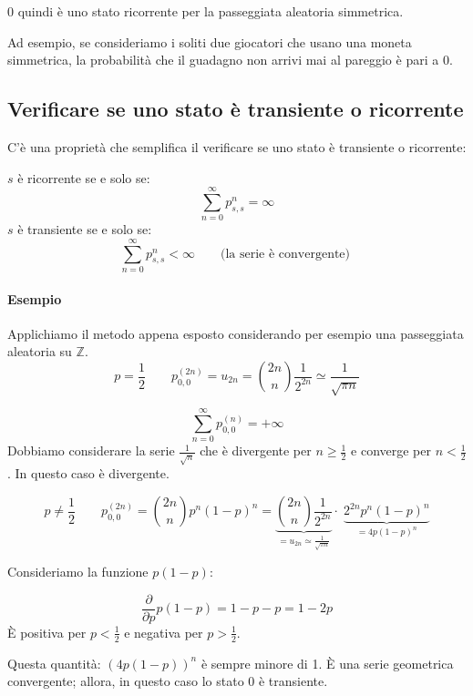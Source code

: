\documentclass[a4paper,12pt]{book}
\begin{document}
0 quindi è uno stato ricorrente per la passeggiata aleatoria simmetrica. 

Ad esempio, se consideriamo i soliti due giocatori che usano una moneta simmetrica, la probabilità che il guadagno non arrivi mai al pareggio è pari a 0. 

\subsection{Verificare se uno stato è transiente o ricorrente}
C'è una proprietà che semplifica il verificare se uno stato è transiente o ricorrente:

$ s $ è ricorrente se e solo se:
$$ \sum_{n=0}^{\infty} p_{s,s}^{n} = \infty $$
$ s $ è transiente se e solo se:
$$ \sum_{n=0}^{\infty} p_{s,s}^{n} < \infty \qquad \text{(la serie è convergente) } $$

\paragraph{Esempio} Applichiamo il metodo appena esposto considerando per esempio una passeggiata aleatoria su $ \mathbb{Z} $.
$$ p = \frac{1}{2} \qquad p_{0,0}^{(2n)} = u_{2n} = \binom{2n}{n}\frac{1}{2^{2n}} \simeq \frac{1}{\sqrt{\pi n}} $$

$$ \sum_{n=0}^{\infty} p_{0,0}^{(n)} = +\infty $$
Dobbiamo considerare la serie $\frac{1}{\sqrt{n}}$ che è divergente per $ n \ge \frac{1}{2} $ e converge per $ n < \frac{1}{2} $. In questo caso è divergente. 

$$ p \ne \frac{1}{2} \qquad p_{0,0}^{(2n)} = \binom{2n}{n} p^n (1-p)^n = \underbrace{\binom{2n}{n}\frac{1}{2^{2n}}}_{\displaystyle = u_{2n} \simeq \frac{1}{\sqrt{\pi n}}} \cdot \; \underbrace{2^{2n} p^n(1-p)^n }_{\displaystyle = 4p(1-p)^n} $$

Consideriamo la funzione $ p(1-p) $:

$$ \frac{\partial}{\partial{p}} p(1-p) = 1 -p -p = 1 - 2p $$
È positiva per $ p < \frac{1}{2} $ e negativa per $ p > \frac{1}{2} $.

\begin{multicols}{2}
	
	Questa quantità: $ (4p(1-p))^n $ è sempre minore di 1. È una serie geometrica convergente; allora, in questo caso lo stato 0 è transiente. 
\end{multicols}
\end{document}
